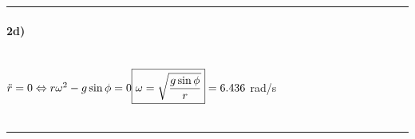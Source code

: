 \hrule
\paragraph{2d)} ~\\
$
\ddot r=0 \Leftrightarrow r\omega^2-g\sin\phi=0\\
\\
\boxed{\omega=\sqrt{\frac{g \sin \phi}{r}}}=6.436$ rad/s\\
\\
\hrule

\newpage



